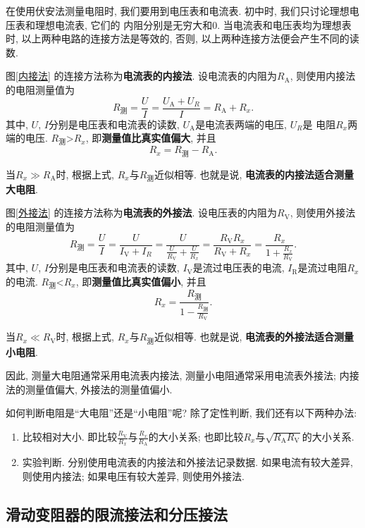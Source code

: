 \documentclass[11pt,a4paper]{ctexbook}
\begin{document}
在使用伏安法测量电阻时, 我们要用到电压表和电流表. 初中时, 我们只讨论理想电压表和理想电流表, 它们的
内阻分别是无穷大和0. 当电流表和电压表均为理想表时, 以上两种电路的连接方法是等效的,
否则, 以上两种连接方法便会产生不同的读数.

图\ref{内接法} 的连接方法称为\textbf{电流表的内接法}. 设电流表的内阻为$R_\text{A}$, 则使用内接法的电阻测量值为
$$R_\text{测} = \frac{U}{I} = \frac{U_\text{A}+U_R}{I} = R_\text{A} + R_x.$$
其中, $U$, $I$分别是电压表和电流表的读数, $U_\text{A}$是电流表两端的电压, $U_R$是
电阻$R_x$两端的电压. $R_\text{测}$>$R_x$, 即\textbf{测量值比真实值偏大}, 并且
$$R_x = R_\text{测} - R_\text{A}.$$

当$R_x\gg R_\text{A}$时, 根据上式, $R_x$与$R_\text{测}$近似相等. 也就是说,
\textbf{电流表的内接法适合测量大电阻}.

图\ref{外接法} 的连接方法称为\textbf{电流表的外接法}. 设电压表的内阻为$R_\text{V}$, 则使用外接法的电阻测量值为
$$R_\text{测} = \frac{U}{I} = \frac{U}{I_\text{V}+I_R} = \frac{U}{\displaystyle\frac{U}{R_\text{V}}+\displaystyle\frac{U}{R_x}} = \frac{R_\text{V}R_x}{R_\text{V}+R_x} = \frac{R_x}{1+\displaystyle\frac{R_x}{R_\text{V}}}.$$
其中, $U$, $I$分别是电压表和电流表的读数, $I_\text{V}$是流过电压表的电流, $I_\text{R}$是流过电阻$R_x$的电流. $R_\text{测}$<$R_x$,
即\textbf{测量值比真实值偏小}, 并且
$$R_x = \frac{R_\text{测}}{1-\displaystyle\frac{R_\text{测}}{R_\text{V}}}.$$

当$R_x\ll R_\text{V}$时, 根据上式, $R_x$与$R_\text{测}$近似相等. 也就是说,
\textbf{电流表的外接法适合测量小电阻}.

因此, 测量大电阻通常采用电流表内接法, 测量小电阻通常采用电流表外接法; 内接法的测量值偏大, 外接法的测量值偏小.

\bigskip
如何判断电阻是``大电阻''还是``小电阻''呢? 除了定性判断, 我们还有以下两种办法:
\begin{enumerate}
    \item 比较相对大小. 即比较$\displaystyle\frac{R_\text{V}}{R_x}$与$\displaystyle\frac{R_x}{R_\text{A}}$的大小关系;
也即比较$R_x$与$\sqrt{R_\text{A}R_\text{V}}$的大小关系.
    \item 实验判断. 分别使用电流表的内接法和外接法记录数据. 如果电流有较大差异, 则使用内接法; 如果电压有较大差异, 则使用外接法.
\end{enumerate}

\subsection{滑动变阻器的限流接法和分压接法}
\end{document}
